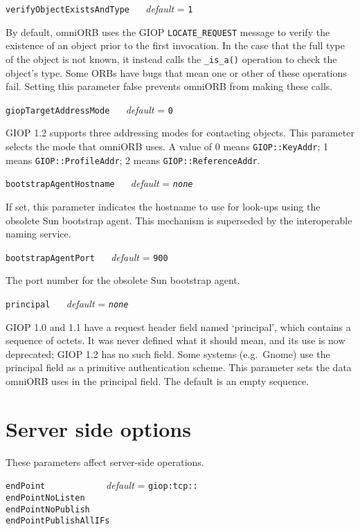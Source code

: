 \documentclass[draft,11pt,twoside,a4paper]{book}
\makeatletter
\newcommand{\code}[1]{\texttt{#1}}
\newcommand{\op}[1]{\texttt{#1()}}
\newcommand{\confopt}[2]
  {\vspace{\baselineskip}\par\noindent\code{#1} ~~ \textit{default} =
   \code{#2}\\[-1ex]\@afterheading}
\makeatother
\begin{document}
\confopt{verifyObjectExistsAndType}{1}

By default, omniORB uses the GIOP \code{LOCATE\_REQUEST} message to
verify the existence of an object prior to the first invocation. In
the case that the full type of the object is not known, it instead
calls the \op{\_is\_a} operation to check the object's type. Some ORBs
have bugs that mean one or other of these operations fail. Setting
this parameter false prevents omniORB from making these calls.


\confopt{giopTargetAddressMode}{0}

GIOP 1.2 supports three addressing modes for contacting objects. This
parameter selects the mode that omniORB uses. A value of 0 means
\code{GIOP::KeyAddr}; 1 means \code{GIOP::ProfileAddr}; 2 means
\code{GIOP::ReferenceAddr}.


\confopt{bootstrapAgentHostname}{\textit{none}}

If set, this parameter indicates the hostname to use for look-ups
using the obsolete Sun bootstrap agent. This mechanism is superseded
by the interoperable naming service.


\confopt{bootstrapAgentPort}{900}

The port number for the obsolete Sun bootstrap agent.


\confopt{principal}{\textit{none}}

GIOP 1.0 and 1.1 have a request header field named `principal', which
contains a sequence of octets. It was never defined what it should
mean, and its use is now deprecated; GIOP 1.2 has no such field. Some
systems (e.g.\ Gnome) use the principal field as a primitive
authentication scheme. This parameter sets the data omniORB uses in
the principal field. The default is an empty sequence.



\section{Server side options}

These parameters affect server-side operations.


\vspace{\baselineskip}

\noindent
\code{endPoint~~~~~~~~~} ~~ \textit{default} = \code{giop:tcp::}\\
\code{endPointNoListen}\\
\code{endPointNoPublish}\\
\code{endPointPublishAllIFs}\\[.1ex]
\end{document}
